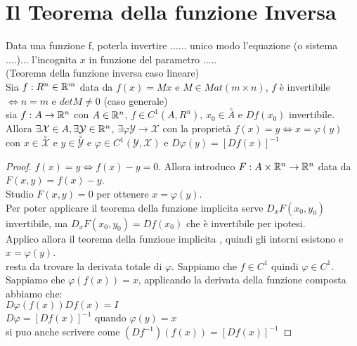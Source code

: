 \section{Il Teorema della funzione Inversa}
Data una funzione f, poterla invertire  ...... unico modo l'equazione (o sistema ....)... l'incognita $x$ in funzione del parametro .....\\
\proposition(Teorema della funzione inversa caso lineare)\\
Sia $f:R^n\in \mathbb{R}^m$ data da $f(x)=Mx$ e $M\in Mat(m\times n)$, $f$ è invertibile $\Leftrightarrow n=m$ e $detM\ne 0$
\proposition(caso generale)\\
sia $f:A\rightarrow \mathbb{R}^n$ con $A\in \mathbb{R}^n$, $f\in C^1(A,R^n)$, $x_0\in \overset{\circ}A$ e $Df(x_0)$ invertibile.\\
Allora $\exists\mathcal{X}\in A,\exists\mathcal{Y}\in \mathbb{R}^n$, $\exists\varphi\mathcal{Y}\rightarrow\mathcal{X}$ con la proprietà $f(x)=y\Leftrightarrow x=\varphi(y)$ con $x\in\overset{\circ}{\mathcal{X}}$ e $y\in\overset{\circ}{\mathcal{Y}}$ e $\varphi\in C^1(\mathcal{Y},\mathcal{X})$ e $D\varphi(y)=[Df(x)]^{-1}$\\
\begin{proof}
	$f(x)=y\Leftrightarrow f(x)-y=0$. Allora introduco $F:A\times \mathbb{R}^n\rightarrow \mathbb{R}^n$ data da $F(x,y)=f(x)-y$.\\
	Studio $F(x,y)=0$ per ottenere $x=\varphi(y)$.\\
	Per poter applicare il teorema della funzione implicita serve $D_xF(x_0,y_0)$ invertibile, ma $D_xF(x_0,y_0)=Df(x_0)$ che è invertibile per ipotesi.\\
	Applico allora il teorema della funzione implicita , quindi gli intorni esistono e $x=\varphi(y)$.\\
	resta da trovare la derivata totale di $\varphi$. Sappiamo che $f\in C^1$ quindi $\varphi \in C^1$.\\
	Sappiamo che $\varphi(f(x))=x$, applicando la derivata della funzione composta abbiamo che:\\
	$D\varphi(f(x))Df(x)=I$\\
	$D\varphi=[Df(x)]^{-1}$ quando $\varphi(y)=x$\\
	si puo anche scrivere come $(Df^{-1})(f(x))=[Df(x)]^{-1}$
\end{proof}
